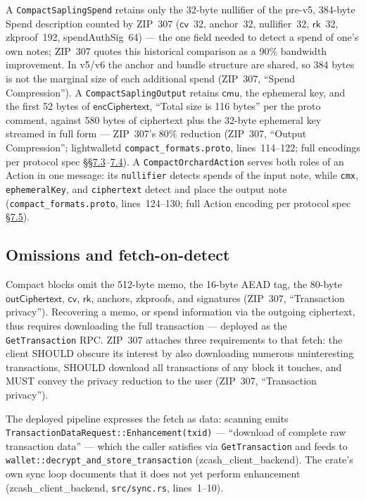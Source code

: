 \documentclass[11pt,a4paper]{article}
\theoremstyle{definition}
\newcommand{\cvsym}{\mathsf{cv}}
\newcommand{\rk}{\mathsf{rk}}
\begin{document}
A \texttt{CompactSaplingSpend} retains only the 32-byte nullifier of the
pre-v5, 384-byte Spend description counted by ZIP~307 ($\cvsym$~32,
anchor~32, nullifier~32, $\rk$~32, zkproof~192, spendAuthSig~64) --- the
one field needed to detect a spend of one's own notes; ZIP~307 quotes this
historical comparison as a 90\% bandwidth improvement. In v5/v6 the anchor
and bundle structure are shared, so 384 bytes is not the marginal size of
each additional spend
(ZIP~307, ``Spend Compression''). A \texttt{CompactSaplingOutput} retains
$\mathsf{cmu}$, the ephemeral key, and the first 52 bytes of
$\mathsf{encCiphertext}$, ``Total size is 116 bytes'' per the proto comment,
against 580 bytes of ciphertext plus the 32-byte ephemeral key streamed in
full form --- ZIP~307's 80\% reduction (ZIP~307, ``Output Compression'';
\textsf{lightwalletd} \texttt{compact\_formats.proto}, lines~114--122; full
encodings per protocol spec \href{https://zips.z.cash/protocol/protocol.pdf\#spendencodingandconsensus}{\S\S7.3}--\href{https://zips.z.cash/protocol/protocol.pdf\#outputencodingandconsensus}{7.4}). A \texttt{CompactOrchardAction}
serves both roles of an Action in one message: its \texttt{nullifier}
detects spends of the input note, while \texttt{cmx},
\texttt{ephemeralKey}, and \texttt{ciphertext} detect and place the output
note (\texttt{compact\_formats.proto}, lines~124--130; full Action encoding
per protocol spec \href{https://zips.z.cash/protocol/protocol.pdf\#actionencodingandconsensus}{\S7.5}).

\subsection{Omissions and fetch-on-detect}\label{sec:sync-compact-omitted}

Compact blocks omit the 512-byte memo, the 16-byte AEAD tag, the 80-byte
$\mathsf{outCiphertext}$, $\cvsym$, $\rk$, anchors, zkproofs, and signatures
(ZIP~307, ``Transaction privacy'').
Recovering a memo, or spend information via the outgoing ciphertext, thus
requires downloading the full transaction --- deployed as the
\texttt{GetTransaction} RPC. ZIP~307 attaches three requirements to that
fetch: the client SHOULD obscure its interest by also downloading numerous
uninteresting transactions, SHOULD download all transactions of any block it
touches, and MUST convey the privacy reduction to the user (ZIP~307,
``Transaction privacy'').

The deployed pipeline expresses the fetch as data: scanning emits
\texttt{TransactionDataRequest::}\allowbreak\texttt{Enhancement(txid)} ---
``download of complete raw transaction data'' --- which the caller
satisfies via \texttt{GetTransaction} and feeds to
\texttt{wallet::}\allowbreak\texttt{decrypt\_and\_store\_transaction}
(\textsf{zcash\_client\_backend}). The crate's own sync loop documents
that it does
not yet perform enhancement (\textsf{zcash\_client\_\allowbreak backend},
\texttt{src/sync.rs}, lines~1--10).
\end{document}
